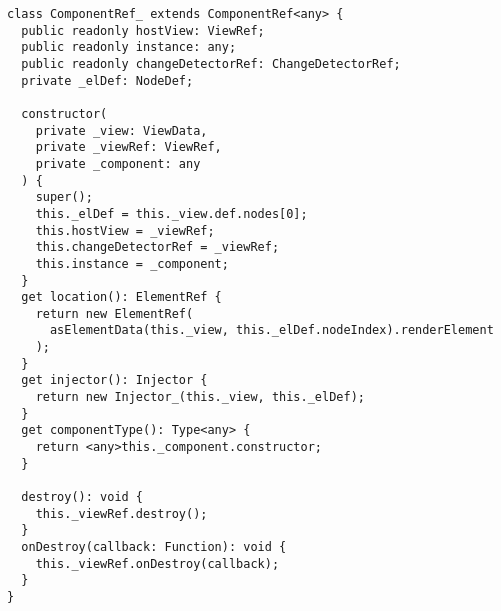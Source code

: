 \begin{verbatim}
class ComponentRef_ extends ComponentRef<any> {
  public readonly hostView: ViewRef;
  public readonly instance: any;
  public readonly changeDetectorRef: ChangeDetectorRef;
  private _elDef: NodeDef;

  constructor(
    private _view: ViewData,
    private _viewRef: ViewRef,
    private _component: any
  ) {
    super();
    this._elDef = this._view.def.nodes[0];
    this.hostView = _viewRef;
    this.changeDetectorRef = _viewRef;
    this.instance = _component;
  }
  get location(): ElementRef {
    return new ElementRef(
      asElementData(this._view, this._elDef.nodeIndex).renderElement
    );
  }
  get injector(): Injector {
    return new Injector_(this._view, this._elDef);
  }
  get componentType(): Type<any> {
    return <any>this._component.constructor;
  }

  destroy(): void {
    this._viewRef.destroy();
  }
  onDestroy(callback: Function): void {
    this._viewRef.onDestroy(callback);
  }
}
\end{verbatim}
